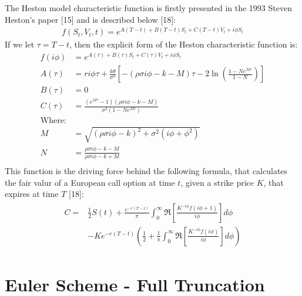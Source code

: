 \documentclass[12pt,twoside]{reedthesis}
\theoremstyle{definition}
\theoremstyle{definition}
\theoremstyle{remark}
\begin{document}
  The Heston model characteristic function is firstly presented in the
  1993 Steven Heston's paper {[}15{]} and is described below {[}18{]}:
  \begin{align}
  f(S_t, V_t, t) = e^{A(T-t)+B(T-t)S_t + C(T-t)V_t + i \phi S_t}
  \end{align}
  If we let \(\tau = T-t\), then the explicit form of the Heston
  characteristic function is:
  \begin{align*}
  f(i \phi) &= e^{A(\tau)+B(\tau)S_t + C(\tau)V_t + i \phi S_t} \\
  A(\tau) &= r i \phi \tau + \frac{k \theta}{\sigma^2} \left[ - (\rho \sigma i \phi - k - M) \tau - 2 \ln\left(\frac{1-N e^{M \tau}}{1-N}\right) \right] \\
  B(\tau) &= 0 \\
  C(\tau) &= \frac{(e^{M \tau}-1)(\rho \sigma i \phi - k - M)}{\sigma^2 (1-N e^{M \tau})} \\
  \text{Where:} & \\
  M &= \sqrt{(\rho \sigma i \phi - k)^2 + \sigma^2 (i \phi + \phi^2)} \\
  N &= \frac{\rho \sigma i \phi - k - M}{\rho \sigma i \phi - k + M} \\
  \end{align*}
  This function is the driving force behind the following formula, that
  calculates the fair valur of a European call option at time \(t\), given
  a strike price \(K\), that expires at time \(T\) {[}18{]}:
  \begin{align} 
  \label{eq:cfheston}
  \begin{split}
  C = & \frac{1}{2} S(t) + \frac{e^{-r(T-t)}}{\pi}\int_{0}^{\infty}{\Re \left[ \frac{K^{-i \phi} f(i \phi + 1)}{i \phi} \right] d\phi} \\
  & -Ke^{-r(T-t)}\left( \frac{1}{2} + \frac{1}{\pi} \int_{0}^{\infty}{\Re \left[ \frac{K^{-i \phi} f(i \phi)}{i \phi} \right]}  d\phi \right)
  \end{split}
  \end{align}
  \section{Euler Scheme - Full
  Truncation}\label{euler-scheme---full-truncation}
  
\end{document}
